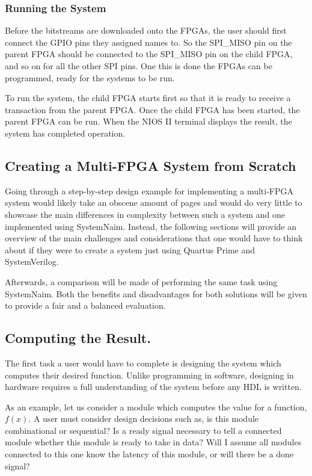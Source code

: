 \subsubsection{Running the System}

Before the bitstreams are downloaded onto the FPGAs, the user should first connect the GPIO pins they assigned names to. So the SPI\_MISO pin on the parent FPGA should be connected to the SPI\_MISO pin on the child FPGA, and so on for all the other SPI pins. One this is done the FPGAs can be programmed, ready for the systems to be run.

To run the system, the child FPGA starts first so that it is ready to receive a transaction from the parent FPGA. Once the child FPGA has been started, the parent FPGA can be run. When the NIOS II terminal displays the result, the system has completed operation.

\subsection{Creating a Multi-FPGA System from Scratch}
\label{sec:scratch}

Going through a step-by-step design example for implementing a multi-FPGA system would likely take an obscene amount of pages and would do very little to showcase the main differences in complexity between such a system and one implemented using SystemNaim. Instead, the following sections will provide an overview of the main challenges and considerations that one would have to think about if they were to create a system just using Quartus Prime and SystemVerilog.

Afterwards, a comparison will be made of performing the same task using SystemNaim. Both the benefits and disadvantages for both solutions will be given to provide a fair and a balanced evaluation.

\subsection{Computing the Result.}
\label{sec:dedicated_hardware_computation}

The first task a user would have to complete is designing the system which computes their desired function. Unlike programming in software, designing in hardware requires a full understanding of the system before any HDL is written.

As an example, let us consider a module which computes the value for a function, $f(x)$. A user must consider design decisions such as, is this module combinational or sequential? Is a ready signal necessary to tell a connected module whether this module is ready to take in data? Will I assume all modules connected to this one know the latency of this module, or will there be a done signal?

